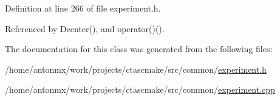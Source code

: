 Definition at line 266 of file experiment.h.



Referenced by Dcenter(), and operator()().



The documentation for this class was generated from the following files:\begin{DoxyCompactItemize}
\item 
/home/antonmx/work/projects/ctascmake/src/common/\hyperlink{experiment_8h}{experiment.h}\item 
/home/antonmx/work/projects/ctascmake/src/common/\hyperlink{experiment_8cpp}{experiment.cpp}\end{DoxyCompactItemize}
